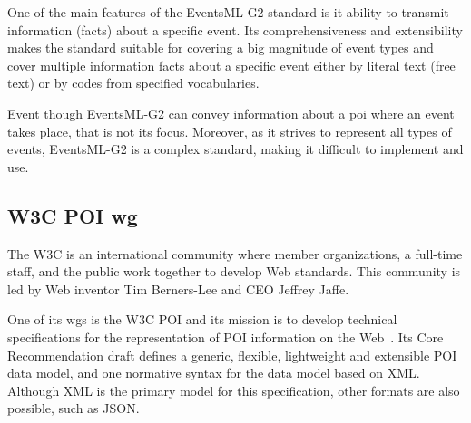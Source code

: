 \documentclass[times,doublespace]{ettauth}%
\begin{document}
One of the main features of the EventsML-G2 standard is it ability to transmit information (facts) about a specific event.
Its comprehensiveness and extensibility makes the standard suitable for covering a big magnitude of event types and cover multiple information facts about a specific event either by literal text (free text) or by codes from specified vocabularies. 

Event though EventsML-G2 can convey information about a \ac{poi} where an event takes place, that is not its focus.
Moreover, as it strives to represent all types of events, EventsML-G2 is a complex standard, making it difficult to implement and use.

\subsection{\acs{W3C} \acl{POI} \acs{wg}}
\label{section:poi-wg}
The \ac{W3C} is an international community where member organizations, a full-time staff, and the public work together to develop Web standards. 
This community is led by Web inventor Tim Berners-Lee and CEO Jeffrey Jaffe. 

One of its \acp{wg} is the \ac{W3C} \ac{POI} and its mission is to develop technical specifications for the representation of \ac{POI} information on the Web~\cite{w3c-poi}. 
Its Core Recommendation draft defines a generic, flexible, lightweight and extensible \ac{POI} data model, and one normative syntax for the data model based on \acf{XML}.
Although \ac{XML} is the primary model for this specification, other formats are also possible, such as \acf{JSON}.
\end{document}

